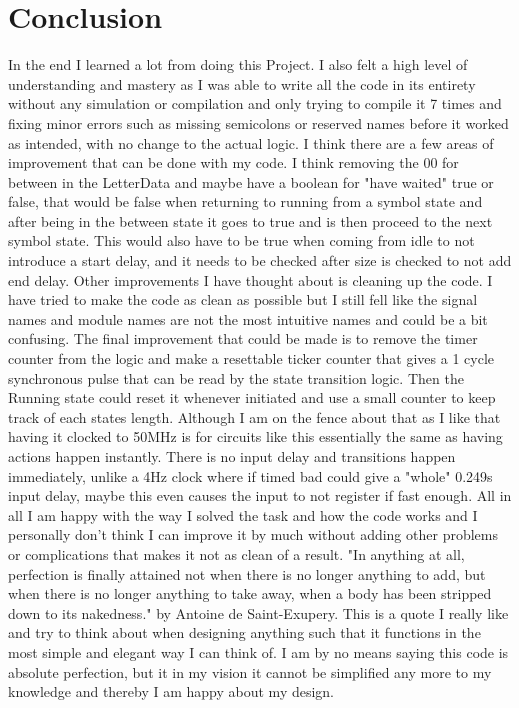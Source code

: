 \documentclass{article}
\begin{document}
\section{Conclusion}
In the end I learned a lot from doing this Project. I also felt a high level of understanding and mastery as I was able to write all the code in its entirety without any simulation or compilation and only trying to compile it 7 times and fixing minor errors such as missing semicolons or reserved names before it worked as intended, with no change to the actual logic. I think there are a few areas of improvement that can be done with my code. I think removing the 00 for between in the LetterData and maybe have a boolean for "have waited" true or false, that would be false when returning to running from a symbol state and after being in the between state it goes to true and is then proceed to the next symbol state. This would also have to be true when coming from idle to not introduce a start delay, and it needs to be checked after size is checked to not add end delay. Other improvements I have thought about is cleaning up the code. I have tried to make the code as clean as possible but I still fell like the signal names and module names are not the most intuitive names and could be a bit confusing. The final improvement that could be made is to remove the timer counter from the logic and make a resettable ticker counter that gives a 1 cycle synchronous pulse that can be read by the state transition logic. Then the Running state could reset it whenever initiated and use a small counter to keep track of each states length. Although I am on the fence about that as I like that having it clocked to 50MHz is for circuits like this essentially the same as having actions happen instantly. There is no input delay and transitions happen immediately, unlike a 4Hz clock where if timed bad could give a "whole" 0.249s input delay, maybe this even causes the input to not register if fast enough. All in all I am happy with the way I solved the task and how the code works and I personally don't think I can improve it by much without adding other problems or complications that makes it not as clean of a result. "In anything at all, perfection is finally attained not when there is no longer anything to add, but when there is no longer anything to take away, when a body has been stripped down to its nakedness." by Antoine de Saint-Exupery. This is a quote I really like and try to think about when designing anything such that it functions in the most simple and elegant way I can think of. I am by no means saying this code is absolute perfection, but it in my vision it cannot be simplified any more to my knowledge and thereby I am happy about my design.
\end{document}
